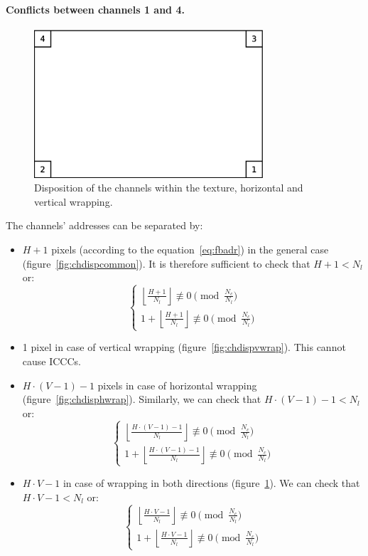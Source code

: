 \documentclass[a4paper,11pt]{kthesis}
\begin{document}
\paragraph{Conflicts between channels 1 and 4.}
\begin{figure}[htp]
\centering
\includegraphics[height=55mm]{chdisp_hvwrap.eps}
\caption{Disposition of the channels within the texture, horizontal and vertical wrapping.}\label{fig:chdisphvwrap}
\end{figure}
The channels' addresses can be separated by:
\begin{itemize}
\item $H + 1$ pixels (according to the equation~\ref{eq:fbadr}) in the general case (figure~\ref{fig:chdispcommon}). It is therefore sufficient to check that $H+1 < N_{l}$ or:
\begin{equation}
\begin{cases}
\left\lfloor \frac{H+1}{N_{l}} \right\rfloor \not \equiv 0 \pmod{\frac{N_{c}}{N_{l}}} \\
1 + \left\lfloor \frac{H+1}{N_{l}} \right\rfloor \not \equiv 0 \pmod{\frac{N_{c}}{N_{l}}}
\end{cases}
\end{equation}
\item 1 pixel in case of vertical wrapping (figure~\ref{fig:chdispvwrap}). This cannot cause ICCCs.
\item $H \cdot (V-1) - 1$ pixels in case of horizontal wrapping (figure~\ref{fig:chdisphwrap}). Similarly, we can check that $H \cdot (V-1) - 1 < N_{l}$ or:
\begin{equation}
\begin{cases}
\left\lfloor \frac{H \cdot (V-1) - 1}{N_{l}} \right\rfloor \not \equiv 0 \pmod{\frac{N_{c}}{N_{l}}} \\
1 + \left\lfloor \frac{H \cdot (V-1) - 1}{N_{l}} \right\rfloor \not \equiv 0 \pmod{\frac{N_{c}}{N_{l}}}
\end{cases}
\end{equation}
\item $H \cdot V - 1$ in case of wrapping in both directions (figure~\ref{fig:chdisphvwrap}). We can check that $H \cdot V - 1 < N_{l}$ or:
\begin{equation}
\begin{cases}
\left\lfloor \frac{H \cdot V - 1}{N_{l}} \right\rfloor \not \equiv 0 \pmod{\frac{N_{c}}{N_{l}}} \\
1 + \left\lfloor \frac{H \cdot V - 1}{N_{l}} \right\rfloor \not \equiv 0 \pmod{\frac{N_{c}}{N_{l}}}
\end{cases}
\end{equation}
\end{itemize}
\end{document}
